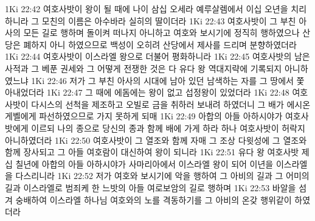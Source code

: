 1Ki 22:42  여호사밧이 왕이 될 때에 나이 삼십 오세라 예루살렘에서 이십 오년을 치리하니라 그 모친의 이름은 아수바라 실히의 딸이더라
1Ki 22:43  여호사밧이 그 부친 아사의 모든 길로 행하며 돌이켜 떠나지 아니하고 여호와 보시기에 정직히 행하였으나 산당은 폐하지 아니 하였으므로 백성이 오히려 산당에서 제사를 드리며 분향하였더라
1Ki 22:44  여호사밧이 이스라엘 왕으로 더불어 평화하니라
1Ki 22:45  여호사밧의 남은 사적과 그 베푼 권세와 그 어떻게 전쟁한 것은 다 유다 왕 역대지략에 기록되지 아니하였느냐
1Ki 22:46  저가 그 부친 아사의 시대에 남아 있던 남색하는 자를 그 땅에서 쫓아내었더라
1Ki 22:47  그 때에 에돔에는 왕이 없고 섭정왕이 있었더라
1Ki 22:48  여호사밧이 다시스의 선척을 제조하고 오빌로 금을 취하러 보내려 하였더니 그 배가 에시온게벨에게 파선하였으므로 가지 못하게 되매
1Ki 22:49  아합의 아들 아하시야가 여호사밧에게 이르되 나의 종으로 당신의 종과 함께 배에 가게 하라 하나 여호사밧이 허락지 아니하였더라
1Ki 22:50  여호사밧이 그 열조와 함께 자매 그 조상 다윗성에 그 열조와 함께 장사되고 그 아들 여호람이 대신하여 왕이 되니라
1Ki 22:51  유다 왕 여호사밧 제 십 칠년에 아합의 아들 아하시야가 사마리아에서 이스라엘 왕이 되어 이년을 이스라엘을 다스리니라
1Ki 22:52  저가 여호와 보시기에 악을 행하여 그 아비의 길과 그 어미의 길과 이스라엘로 범죄케 한 느밧의 아들 여로보암의 길로 행하며
1Ki 22:53  바알을 섬겨 숭배하여 이스라엘 하나님 여호와의 노를 격동하기를 그 아비의 온갖 행위같이 하였더라


